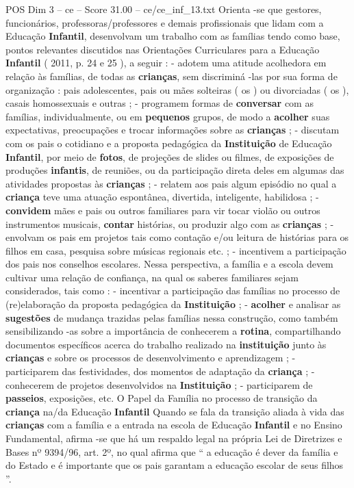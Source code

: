 \begin{textsample}{POS Dim 3 – ce – Score 31.00 – ce/ce\_inf\_13.txt}
Orienta -se que gestores, funcionários, professoras/professores e demais profissionais que lidam com a Educação \textbf{Infantil}, desenvolvam um trabalho com as famílias tendo como base, pontos relevantes discutidos nas Orientações Curriculares para a Educação \textbf{Infantil} ( 2011, p. 24 e 25 ), a seguir : - adotem uma atitude acolhedora em relação às famílias, de todas as \textbf{crianças}, sem discriminá -las por sua forma de organização : pais adolescentes, pais ou mães solteiras ( os ) ou divorciadas ( os ), casais homossexuais e outras ; - programem formas de \textbf{conversar} com as famílias, individualmente, ou em \textbf{pequenos} grupos, de modo a \textbf{acolher} suas expectativas, preocupações e trocar informações sobre as \textbf{crianças} ; - discutam com os pais o cotidiano e a proposta pedagógica da \textbf{Instituição} de Educação \textbf{Infantil}, por meio de \textbf{fotos}, de projeções de slides ou filmes, de exposições de produções \textbf{infantis}, de reuniões, ou da participação direta deles em algumas das atividades propostas às \textbf{crianças} ; - relatem aos pais algum episódio no qual a \textbf{criança} teve uma atuação espontânea, divertida, inteligente, habilidosa ; - \textbf{convidem} mães e pais ou outros familiares para vir tocar violão ou outros instrumentos musicais, \textbf{contar} histórias, ou produzir algo com as \textbf{crianças} ; - envolvam os pais em projetos tais como contação e/ou leitura de histórias para os filhos em casa, pesquisa sobre músicas regionais etc. ; - incentivem a participação dos pais nos conselhos escolares.
Nessa perspectiva, a família e a escola devem cultivar uma relação de confiança, na qual os saberes familiares sejam considerados, tais como : - incentivar a participação das famílias no processo de (re)elaboração da proposta pedagógica da \textbf{Instituição} ; - \textbf{acolher} e analisar as \textbf{sugestões} de mudança trazidas pelas famílias nessa construção, como também sensibilizando -as sobre a importância de conhecerem a \textbf{rotina}, compartilhando documentos específicos acerca do trabalho realizado na \textbf{instituição} junto às \textbf{crianças} e sobre os processos de desenvolvimento e aprendizagem ; - participarem das festividades, dos momentos de adaptação da \textbf{criança} ; - conhecerem de projetos desenvolvidos na \textbf{Instituição} ; - participarem de \textbf{passeios}, exposições, etc.
O Papel da Família no processo de transição da \textbf{criança} na/da Educação \textbf{Infantil} Quando se fala da transição aliada à vida das \textbf{crianças} com a família e a entrada na escola de Educação \textbf{Infantil} e no Ensino Fundamental, afirma -se que há um respaldo legal na própria Lei de Diretrizes e Bases nº 9394/96, art. 2º, no qual afirma que “ a educação é dever da família e do Estado e é importante que os pais garantam a educação escolar de seus filhos ”.

\end{textsample}
